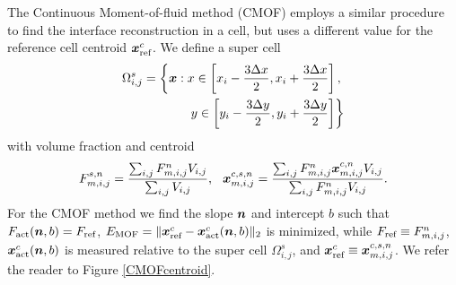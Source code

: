 \documentclass[]{article}
\newcommand{\tn}{\textnormal}
\newcommand{\bmx}{\mbox{\boldmath $x$\unboldmath}}
\newcommand{\bmn}{\mbox{\boldmath $n$\unboldmath}}
\begin{document}
The Continuous Moment-of-fluid method (CMOF) employs a similar 
procedure to find the interface reconstruction in a cell, 
but uses a different value for the reference cell 
centroid $\bmx_\tn{ref}^c$. We define a super cell 
\begin{eqnarray}
  \label{eq:super_cell_def}
  \Omega_{i,j}^s = 
\left\{ \bmx: x \in \left[x_i-\frac{3\Delta x}{2}, x_i+\frac{3\Delta x}{2}\right],\right.\\
\left. y \in \left[ y_i-\frac{3\Delta y}{2}, y_i+\frac{3\Delta y}{2}\right] \right\}
\end{eqnarray}
with volume fraction and centroid
\begin{equation}
\label{eq:super_cell_f_x}
F_{m,i,j}^{s,n} = \frac{\sum_{i,j} F_{m,i,j}^n V_{i,j}}{\sum_{i,j} V_{i,j}}, 
\hspace{0.25cm}
\bmx_{m,i,j}^{c,s,n} = 
\frac{\sum_{i,j} F_{m,i,j}^n \bmx_{m,i,j}^{c,n} V_{i,j}}
     {\sum_{i,j} F_{m,i,j}^n V_{i,j}}.
\end{equation}
For the CMOF method we find the slope $\bmn$ and intercept $b$ such that 
$F_\tn{act}(\bmn,b) = F_\tn{ref}$, 
$E_\tn{MOF} = \lVert \bmx_\tn{ref}^c - \bmx_\tn{act}^c(\bmn,b) \rVert_2$ 
is minimized, while 
$F_\tn{ref} \equiv F_{m,i,j}^{n}$, 
$\bmx_\tn{act}^c(\bmn,b)$ is measured relative to the super cell 
$\Omega_{i,j}^s$,
and 
$\bmx_\tn{ref}^c \equiv \bmx_{m,i,j}^{c,s,n}$.
We refer the reader to Figure \ref{CMOFcentroid}.
\end{document}
